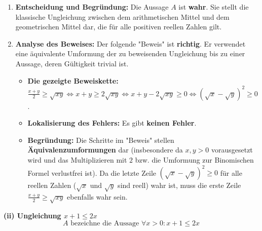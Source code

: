 \documentclass{article}
\begin{document}
\begin{enumerate}[label=(\alph*)]
    \item \textbf{Entscheidung und Begründung:}
    Die Aussage $A$ ist \textbf{wahr}.
    Sie stellt die klassische Ungleichung zwischen dem arithmetischen Mittel und dem geometrischen Mittel dar, die für alle positiven reellen Zahlen gilt.

    \item \textbf{Analyse des Beweises:}
    Der folgende "Beweis" ist \textbf{richtig}. Er verwendet eine äquivalente Umformung der zu beweisenden Ungleichung bis zu einer Aussage, deren Gültigkeit trivial ist.
    \begin{itemize}
        \item \textbf{Die gezeigte Beweiskette:} $\frac{x+y}{2} \geq \sqrt{xy} \iff x+y \geq 2\sqrt{xy} \iff x+y - 2\sqrt{xy} \geq 0 \iff (\sqrt{x} - \sqrt{y})^2 \geq 0$.
        \item \textbf{Lokalisierung des Fehlers:} Es gibt \textbf{keinen Fehler}.
        \item \textbf{Begründung:} Die Schritte im "Beweis" stellen \textbf{Äquivalenzumformungen} dar (insbesondere da $x, y > 0$ vorausgesetzt wird und das Multiplizieren mit $2$ bzw. die Umformung zur Binomischen Formel verlustfrei ist). Da die letzte Zeile $(\sqrt{x} - \sqrt{y})^2 \geq 0$ für alle reellen Zahlen ($\sqrt{x}$ und $\sqrt{y}$ sind reell) wahr ist, muss die erste Zeile $\frac{x+y}{2} \geq \sqrt{xy}$ ebenfalls wahr sein.
    \end{itemize}
\end{enumerate}

\bigskip

\textbf{(ii) Ungleichung $x+1 \leq 2x$}
\[
    A \text{ bezeichne die Aussage } \forall x > 0: x+1 \leq 2x
\]
\end{document}

